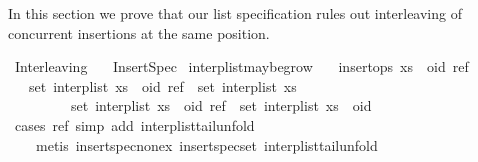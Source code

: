 %
\begin{isabellebody}%
%
%
\isamarkuptrue%
%
\begin{isamarkuptext}%
In this section we prove that our list specification rules out
interleaving of concurrent insertions at the same position.%
\end{isamarkuptext}\isamarkuptrue%
%
\isadelimtheory
%
\endisadelimtheory
%
\isatagtheory
{}\isamarkupfalse%
\ Interleaving\isanewline
\ \ \ Insert{\isacharunderscore}Spec\isanewline
{}%
\endisatagtheory
{\isafoldtheory}%
%
\isadelimtheory
%
\endisadelimtheory
\isanewline
\isanewline
{}\isamarkupfalse%
\ interp{\isacharunderscore}list{\isacharunderscore}maybe{\isacharunderscore}grow{\isacharcolon}\isanewline
\ \ \ {\isachardoublequoteopen}insert{\isacharunderscore}ops\ {\isacharparenleft}xs\ {\isacharat}\ {\isacharbrackleft}{\isacharparenleft}oid{\isacharcomma}\ ref{\isacharparenright}{\isacharbrackright}{\isacharparenright}{\isachardoublequoteclose}\isanewline
\ \ \ {\isachardoublequoteopen}set\ {\isacharparenleft}interp{\isacharunderscore}list\ {\isacharparenleft}xs\ {\isacharat}\ {\isacharbrackleft}{\isacharparenleft}oid{\isacharcomma}\ ref{\isacharparenright}{\isacharbrackright}{\isacharparenright}{\isacharparenright}\ {\isacharequal}\ set\ {\isacharparenleft}interp{\isacharunderscore}list\ xs{\isacharparenright}\ {\isasymor}\isanewline
\ \ \ \ \ \ \ \ \ set\ {\isacharparenleft}interp{\isacharunderscore}list\ {\isacharparenleft}xs\ {\isacharat}\ {\isacharbrackleft}{\isacharparenleft}oid{\isacharcomma}\ ref{\isacharparenright}{\isacharbrackright}{\isacharparenright}{\isacharparenright}\ {\isacharequal}\ {\isacharparenleft}set\ {\isacharparenleft}interp{\isacharunderscore}list\ xs{\isacharparenright}\ {\isasymunion}\ {\isacharbraceleft}oid{\isacharbraceright}{\isacharparenright}{\isachardoublequoteclose}\isanewline
%
\isadelimproof
%
\endisadelimproof
%
\isatagproof
{}\isamarkupfalse%
\ {\isacharparenleft}cases\ ref{\isacharcomma}\ simp\ add{\isacharcolon}\ interp{\isacharunderscore}list{\isacharunderscore}tail{\isacharunderscore}unfold{\isacharcomma}\isanewline
\ \ \ \ metis\ insert{\isacharunderscore}spec{\isacharunderscore}nonex\ insert{\isacharunderscore}spec{\isacharunderscore}set\ interp{\isacharunderscore}list{\isacharunderscore}tail{\isacharunderscore}unfold{\isacharparenright}%
\endisatagproof
{\isafoldproof}%
%
\isadelimproof
\isanewline

\end{isabellebody}
